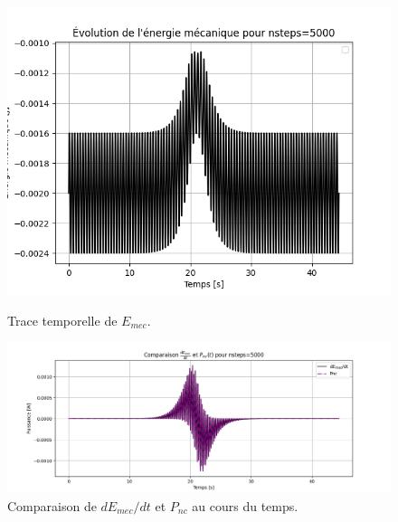\documentclass[a4paper,12pt,twoside]{article}
\begin{document}
\begin{figure}[H]
    \centering
    \begin{minipage}{0.47\textwidth}
        \centering
        \includegraphics[width=\linewidth]{graphes/question_2_E_mec_manquant.png}
        \captionsetup{justification=centering}
        \caption{Trace temporelle de $E_{mec}$.}
        \label{fig4}
    \end{minipage}
    \hfill
    \begin{minipage}{0.47\textwidth}
        \centering
        \includegraphics[width=\linewidth]{graphes/question_2_E_mec.png}
        \captionsetup{justification=centering}
        \caption{Comparaison de $dE_{mec}/dt$ et $P_{nc}$ au cours du temps.}
        \label{fig5}
    \end{minipage}
\end{figure}
\end{document}
